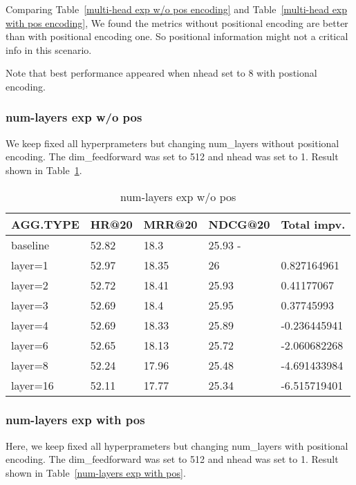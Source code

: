 \documentclass{article}
\begin{document}
Comparing  Table~\ref{multi-head exp w/o pos encoding} and
Table~\ref{multi-head exp with pos encoding},
We found the metrics without positional encoding are
better than with positional encoding one.
So positional information might not a critical info in this scenario.

Note that best performance appeared when nhead set to 8 with postional encoding.

\subsubsection{num-layers exp w/o pos}

We keep fixed all hyperprameters but
changing num\_layers without positional encoding.
The dim\_feedforward was set to 512 and nhead was set to 1.
Result shown in Table~\ref{num-layers exp w/o pos}.

\begin{table}
    \caption{num-layers exp w/o pos}
    \label{num-layers exp w/o pos}
    \centering
    \begin{tabular}{lllll}
        \toprule
        AGG.TYPE & HR@20 & MRR@20 & NDCG@20 & Total impv.  \\
        \midrule
        baseline & 52.82 & 18.3   & 25.93	-                 \\
        layer=1  & 52.97 & 18.35  & 26      & 0.827164961  \\
        layer=2  & 52.72 & 18.41  & 25.93   & 0.41177067   \\
        layer=3  & 52.69 & 18.4   & 25.95   & 0.37745993   \\
        layer=4  & 52.69 & 18.33  & 25.89   & -0.236445941 \\
        layer=6  & 52.65 & 18.13  & 25.72   & -2.060682268 \\
        layer=8  & 52.24 & 17.96  & 25.48   & -4.691433984 \\
        layer=16 & 52.11 & 17.77  & 25.34   & -6.515719401 \\
        \bottomrule
    \end{tabular}
\end{table}


\subsubsection{num-layers exp with pos}

Here, we keep fixed all hyperprameters but
changing num\_layers with positional encoding.
The dim\_feedforward was set to 512 and nhead was set to 1.
Result shown in Table~\ref{num-layers exp with pos}.
\end{document}

